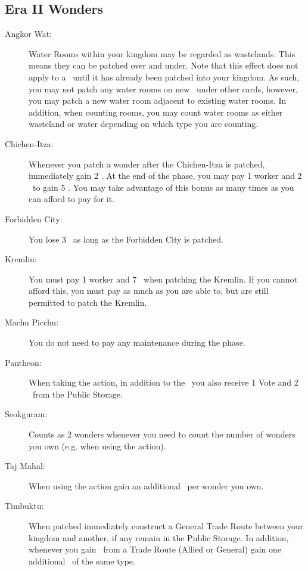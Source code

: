 \documentclass[10pt,twocolumn]{article}
\begin{document}
\begin{appendices}
\subsection{Era II Wonders}
\begin{description}
\item[Angkor Wat:] Water Rooms within your kingdom may be regarded as wastelands. This means they can be patched over and under. Note that this effect does not apply to a \landcard\ until it has already been patched into your kingdom. As such, you may not patch any water rooms on new \landcards\ under other cards, however, you may patch a new water room adjacent to existing water rooms. In addition, when counting rooms, you may count water rooms as either wasteland or water depending on which type you are counting.
\item[Chichen-Itza:] Whenever you patch a wonder after the Chichen-Itza is patched, immediately gain 2 \minerals. At the end of the  phase, you may pay 1 worker and 2 \minerals\ to gain 5 \vps. You may take advantage of this bonus as many times as you can afford to pay for it.
\item[Forbidden City:] You lose 3 \mil\ as long as the Forbidden City is patched.
\item[Kremlin:] You must pay 1 worker and 7 \vps\ when patching the Kremlin. If you cannot afford this, you must pay as much as you are able to, but are still permitted to patch the Kremlin.
\item[Machu Picchu:] You do not need to pay any maintenance during the  phase.
\item[Pantheon:] When taking the  action, in addition to the \vps\ you also receive 1 Vote and 2 \money\ from the Public Storage.
\item[Seokguram:] Counts as 2 wonders whenever you need to count the number of wonders you own (e.g. when using the  action).
\item[Taj Mahal:] When using the  action gain an additional \vp\ per wonder  you own.
\item[Timbuktu:] When patched immediately construct a General Trade Route between your kingdom and another, if any remain in the Public Storage. In addition, whenever you gain \goods\ from a Trade Route (Allied or General) gain one additional \good\ of the same type.
\end{description}

\end{appendices}
\end{document}
